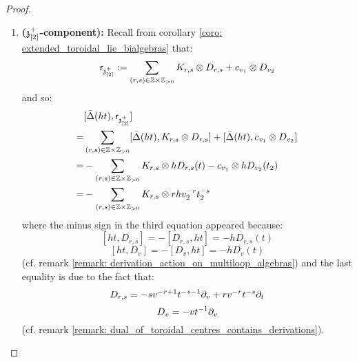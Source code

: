 \begin{proof}
\begin{enumerate}
\begin{enumerate}
                        \item \textbf{($\mathfrak{z}_{[2]}^{+}$-component):} Recall from corollary \ref{coro: extended_toroidal_lie_bialgebras} that:
                            $$\sfr_{\z_{[2]}^{\positive}} := \sum_{(r, s) \in \Z \x \Z_{> 0}} K_{r, s} \tensor D_{r, s} + c_{v_1} \tensor D_{v_2}$$
                        and so:
                            $$
                                \begin{aligned}
                                    & [\bar{\Delta}(ht), \sfr_{\z_{[2]}^{\positive}}]
                                    \\
                                    = & \sum_{(r, s) \in \Z \x \Z_{> 0}} [\bar{\Delta}(ht), K_{r, s} \tensor D_{r, s}] + [\bar{\Delta}(ht), c_{v_1} \tensor D_{v_2}]
                                    \\
                                    = & -\sum_{(r, s) \in \Z \x \Z_{> 0}} K_{r, s} \tensor h D_{r, s}(t) - c_{v_1} \tensor h D_{v_2}(t_2)
                                    \\
                                    = & -\sum_{(r, s) \in \Z \x \Z_{> 0}} K_{r, s} \tensor r h v_2^{-r} t_2^{-s}
                                \end{aligned}
                            $$
                        where the minus sign in the third equation appeared because:
                            $$[ht, D_{r, s}] = -[D_{r, s}, ht] = -h D_{r, s}(t)$$
                            $$[ht, D_v] = -[D_v, ht] = -h D_v(t)$$
                        (cf. remark \ref{remark: derivation_action_on_multiloop_algebras}) and the last equality is due to the fact that:
                            $$D_{r, s} = -s v^{-r + 1} t^{-s - 1} \partial_v + r v^{-r} t^{-s} \partial_t$$
                            $$D_v = -v t^{-1} \partial_v$$
                        (cf. remark \ref{remark: dual_of_toroidal_centres_contains_derivations}). 
                        

\end{enumerate}
\end{enumerate}
\end{proof}

